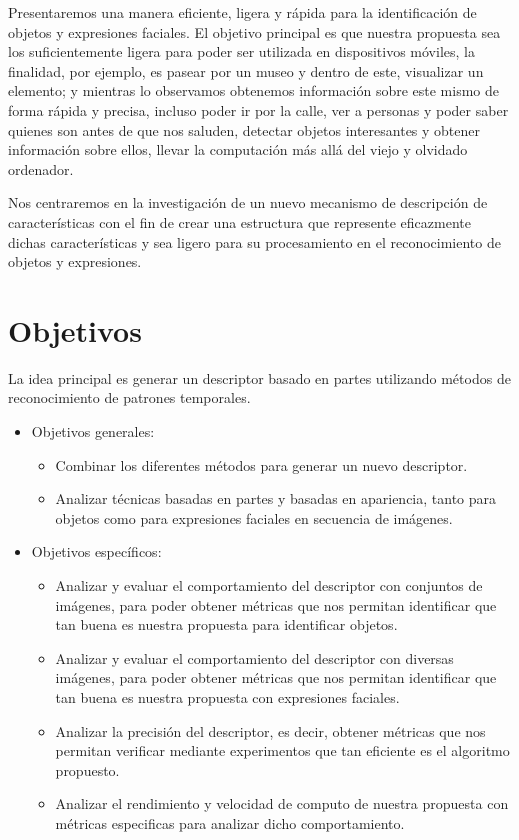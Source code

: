 Presentaremos una manera eficiente, ligera y rápida para la identificación de objetos y expresiones faciales. El objetivo principal es que nuestra propuesta sea los suficientemente ligera para poder ser utilizada en dispositivos móviles, la finalidad, por ejemplo, es pasear por un museo y dentro de este, visualizar un elemento; y mientras lo observamos obtenemos información sobre este mismo de forma rápida y precisa, incluso poder ir por la calle, ver a personas y poder saber quienes son antes de que nos saluden, detectar objetos interesantes y obtener información sobre ellos, llevar la computación más allá del viejo y olvidado ordenador.

Nos centraremos en la investigación de un nuevo mecanismo de descripción de características con el fin de crear una estructura que represente eficazmente dichas características y sea ligero para su procesamiento en el reconocimiento de objetos y expresiones.

\section{Objetivos}
La idea principal es generar un descriptor basado en partes utilizando métodos de reconocimiento de patrones temporales.
\begin{itemize}
		\item Objetivos generales:
			\begin{itemize}
				\item Combinar los diferentes métodos para generar un nuevo descriptor.
				\item Analizar técnicas basadas en partes y basadas en apariencia, tanto para objetos como para expresiones faciales en secuencia de imágenes.
			\end{itemize}
		\item Objetivos específicos:
			\begin{itemize}
				\item Analizar y evaluar el comportamiento del descriptor con conjuntos de imágenes, para poder obtener métricas que nos permitan identificar que tan buena es nuestra propuesta para identificar objetos.
				\item Analizar y evaluar el comportamiento del descriptor con diversas imágenes, para poder obtener métricas que nos permitan identificar que tan buena es nuestra propuesta con expresiones faciales.
				\item Analizar la precisión del descriptor, es decir, obtener métricas que nos permitan verificar mediante experimentos que tan eficiente es el algoritmo propuesto.
				\item Analizar el rendimiento y velocidad de computo de nuestra propuesta con métricas especificas para analizar dicho comportamiento.
				
			\end{itemize}			

	\end{itemize}

